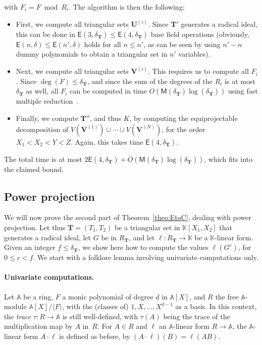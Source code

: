 \documentclass[12pt]{article}
\def\EE {\ensuremath{\mathsf{E}}}
\def\K {\ensuremath{\mathbb{K}}}
\def\A {\ensuremath{\mathbb{A}}}
\def\M {\ensuremath{\mathsf{M}}}
\def\Tt {\ensuremath{\mathbf{T}}}
\def\Uu {\ensuremath{\mathbf{U}}}
\def\Vv {\ensuremath{\mathbf{V}}}
\begin{document}
with $F_i = F \bmod R_i$. The algorithm is then the following:
\begin{itemize}
\item First, we compute all triangular sets $\Uu^{(i)}$. Since $\Tt'$
  generates a radical ideal, this can be done in $\EE(3,\delta_\Tt)\le
  \EE(4,\delta_\Tt)$ base field operations (obviously, $\EE(n,\delta)
  \le \EE(n',\delta)$ holds for all $n\le n'$, as can be seen by using
  $n'-n$ dummy polynomials to obtain a triangular set in $n'$
  variables).
\item Next, we compute all triangular sets $\Vv^{(i)}$. This requires
  us to compute all $F_i$. Since $\deg(F) \le \delta_\Tt$, and since
  the sum of the degrees of the $R_i$ is at most $\delta_\Tt$ as well,
  all $F_i$ can be computed in time
  $O(\M(\delta_\Tt)\log(\delta_\Tt))$ using fast multiple
  reduction~\cite[Chapter~10]{GaGe03}.
\item Finally, we compute $\Tt''$, and thus $K$, by computing the
  equiprojectable decomposition of $V(\Vv^{(1)}) \cup \cdots \cup
  V(\Vv^{(N)})$, for the order $X_1 <X_2 < Y <Z$. Again, this takes
  time $\EE(4,\delta_\Tt)$.
\end{itemize}
The total time is at most
$2\EE(4,\delta_\Tt)+O(\M(\delta_\Tt)\log(\delta_\Tt))$, which fits
into the claimed bound.



\subsection{Power projection}

We will now prove the second part of Theorem~\ref{theo:EtoC}, dealing
with power projection. Let thus $\Tt=(T_1,T_2)$ be a triangular set in
$\K[X_1,X_2]$ that generates a radical ideal, let $G$ be in $R_\Tt$,
and let $\ell:R_\Tt \to \K$ be a $\K$-linear form. Given an integer $f
\le \delta_\Tt$, we show here how to compute the values $\ell(G^c)$,
for $0 \le c< f$. We start with a folklore lemma involving univariate
computations only.

\paragraph{Univariate computations.}
Let $\A$ be a ring, $F$ a monic polynomial of degree $d$ in $\A[X]$,
and $R$ the free $\A$-module $\A[X]/\langle F \rangle$, with the
(classes of) $1,X,\dots,X^{d-1}$ as a basis. In this context, the {\em
  trace} $\tau: R \to \A$ is still well-defined, with $\tau(A)$ being
the trace of the multiplication map by $A$ in~$R$.  For $A\in R$ and
$\ell$ an $\A$-linear form $R \to \A$, the $\A$-linear form $A\cdot
\ell$ is defined as before, by $(A \cdot \ell)(B)=\ell(AB)$.
\end{document}
